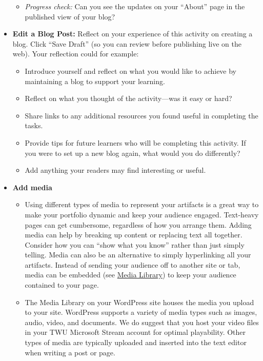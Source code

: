 \documentclass[
  letterpaper,
  DIV=11,
  numbers=noendperiod]{scrreprt}
\providecommand{\tightlist}{%
  \setlength{\itemsep}{0pt}\setlength{\parskip}{0pt}}\usepackage{longtable,booktabs,array}
\begin{document}
\begin{tcolorbox}
\begin{itemize}
  \begin{itemize}
  \tightlist
  \item
    \emph{Progress check:} Can you see the updates on your ``About''
    page in the published view of your blog?
  \end{itemize}
\item
  \textbf{Edit a Blog Post:} Reflect on your experience of this activity
  on creating a blog. Click ``Save Draft'' (so you can review before
  publishing live on the web). Your reflection could for example:

  \begin{itemize}
  \tightlist
  \item
    Introduce yourself and reflect on what you would like to achieve by
    maintaining a blog to support your learning.
  \item
    Reflect on what you thought of the activity---was it easy or hard?
  \item
    Share links to any additional resources you found useful in
    completing the tasks.
  \item
    Provide tips for future learners who will be completing this
    activity. If you were to set up a new blog again, what would you do
    differently?
  \item
    Add anything your readers may find interesting or useful.
  \end{itemize}
\item
  \textbf{Add media}

  \begin{itemize}
  \tightlist
  \item
    Using different types of media to represent your artifacts is a
    great way to make your portfolio dynamic and keep your audience
    engaged. Text-heavy pages can get cumbersome, regardless of how you
    arrange them. Adding media can help by breaking up content or
    replacing text all together. Consider how you can ``show what you
    know'' rather than just simply telling. Media can also be an
    alternative to simply hyperlinking all your artifacts. Instead of
    sending your audience off to another site or tab, media can be
    embedded (see
    \href{https://create.twu.ca/eportfolios/wordpress/media-library/}{Media
    Library}) to keep your audience contained to your page.
  \item
    The Media Library on your WordPress site houses the media you upload
    to your site. WordPress supports a variety of media types such as
    images, audio, video, and documents. We do suggest that you host
    your video files in your TWU Microsoft Stream account for optimal
    playability. Other types of media are typically uploaded and
    inserted into the text editor when writing a post or page.
  \end{itemize}
\end{itemize}


\end{tcolorbox}
\end{document}
